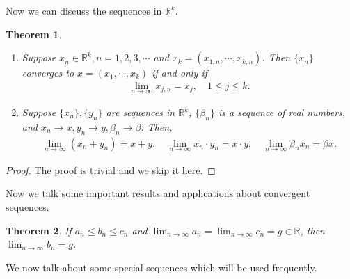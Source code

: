 \documentclass[11pt]{book}
\newtheorem{theorem}{Theorem}[chapter]
\theoremstyle{definition}
\numberwithin{equation}{chapter}
\begin{document}
\medskip

Now we can discuss the sequences in $\mathbb{R}^k$.

\medskip

\begin{theorem}
~\begin{enumerate}[label=(\alph*)]
    \item Suppose $x_n \in \mathbb{R}^k, n = 1,2,3,\cdots$ and $x_k = (x_{1,n}, \cdots, x_{k,n})$. Then $\{x_n\}$ converges to $x = (x_1, \cdots, x_k)$ if and only if 
    \begin{align*}
        \lim_{n\to\infty} x_{j,n} = x_j, \quad 1 \leq j \leq k.
    \end{align*}
    
    \item Suppose $\{x_n\}, \{y_n\}$ are sequences in $\mathbb{R}^k$, $\{\beta_n\}$ is a sequence of real numbers, and $x_n \to x, y_n \to y, \beta_n \to \beta$. Then,
    \begin{align*}
        \lim_{n\to\infty} (x_n + y_n) = x + y, \quad \lim_{n\to\infty} x_n \cdot y_n = x \cdot y, \quad \lim_{n\to\infty} \beta_n x_n = \beta x.
    \end{align*}
\end{enumerate}
\end{theorem}
\begin{proof}
The proof is trivial and we skip it here.
\end{proof}

\medskip

Now we talk some important results and applications about convergent sequences.

\medskip

\begin{theorem}
If $a_n \leq b_n \leq c_n$ and $\lim_{n\to\infty} a_n = \lim_{n\to\infty} c_n = g \in \mathbb{R}$, then $\lim_{n\to\infty} b_n = g$.
\end{theorem}

\medskip

We now talk about some special sequences which will be used frequently.

\medskip
\end{document}
